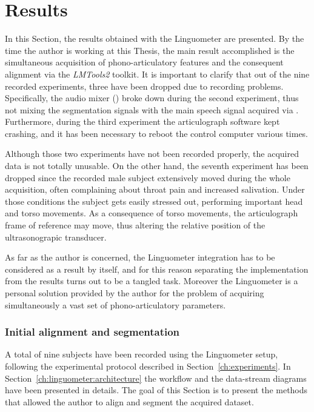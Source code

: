 \chapter{Results}
\label{ch:results}
In this Section, the results obtained with the Linguometer are presented.
By the time the author is working at this Thesis, the main result accomplished
is the simultaneous acquisition of phono-articulatory features and the
consequent alignment via the \emph{LMTools2} toolkit.
It is important to clarify that out of the nine recorded experiments, three 
have been dropped due to recording problems.
Specifically, the audio mixer () broke down during the second
experiment, thus not mixing the segmentation signals with the main speech 
signal acquired via .
Furthermore, during the third experiment the articulograph software kept 
crashing, and it has been necessary to reboot the control computer various
times.

Although those two experiments have not been recorded properly, the acquired 
data is not totally unusable.
On the other hand, the seventh experiment has been dropped since the recorded 
male subject extensively moved during the whole acquisition, often complaining
about throat pain and increased salivation.
Under those conditions the subject gets easily stressed out, performing
important head and torso movements.
As a consequence of torso movements, the articulograph frame of reference may
move, thus altering the relative position of the ultrasonograpic transducer.

As far as the author is concerned, the Linguometer integration has to be 
considered as a result by itself, and for this reason separating the
implementation from the results turns out to be a tangled task.
Moreover
the Linguometer is a personal solution provided by the author for the
problem of acquiring simultaneously a vast set of phono-articulatory
parameters.

\subsection{Initial alignment and segmentation}
A total of nine subjects have been recorded using the Linguometer setup,
following the experimental protocol described in Section~\ref{ch:experiments}.
In Section~\ref{ch:linguometer:architecture} the workflow and the data-stream
diagrams have been presented in details.
The goal of this Section is to present the methods that allowed the author to
align and segment the acquired dataset.

